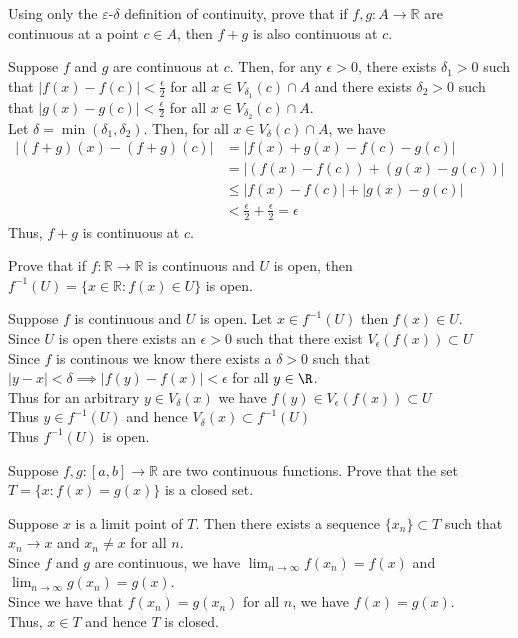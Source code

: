 \documentclass[answers,12pt,addpoints]{exam}
\begin{document}
\begin{questions}
    \question Using only the $\varepsilon$-$\delta$ definition of continuity, prove that if $f, g : A \to \mathbb{R}$ are continuous at a point $c \in A$, then $f + g$ is also continuous at $c$.
    \begin{solution}
        Suppose $f$ and $g$ are continuous at $c$. Then, for any $\epsilon > 0$, there exists $\delta_1 > 0$ such that $|f(x) - f(c)| < \frac{\epsilon}{2}$ for all $x \in V_{\delta_1}(c) \cap A$ and there exists $\delta_2 > 0$ such that $|g(x) - g(c)| < \frac{\epsilon}{2}$ for all $x \in V_{\delta_2}(c) \cap A$.\\
        Let $\delta = \min(\delta_1, \delta_2)$. Then, for all $x \in V_\delta(c) \cap A$, we have
        \begin{align*}
            |(f + g)(x) - (f + g)(c)| &= |f(x) + g(x) - f(c) - g(c)| \\
            &= |(f(x) - f(c)) + (g(x) - g(c))| \\
            &\leq |f(x) - f(c)| + |g(x) - g(c)| \\
            &< \frac{\epsilon}{2} + \frac{\epsilon}{2} = \epsilon
        \end{align*}
        Thus, $f + g$ is continuous at $c$.
    \end{solution}

    \question Prove that if $f : \mathbb{R} \to \mathbb{R}$ is continuous and $U$ is open, then $f^{-1}(U) = \{x \in \mathbb{R} : f(x) \in U\}$ is open.
    \begin{solution}
        Suppose $f$ is continuous and $U$ is open. Let $ x \in f^{-1}(U)$ then $f(x) \in U$. \\
        Since $U$ is open there exists an $\epsilon>0$ such that there exist $V_{\epsilon}(f(x)) \subset U$ \\
        Since $f$ is continous we know there exists a $\delta > 0$ such that $|y -x| < \delta \implies |f(y) - f(x)| < \epsilon$ for all $y \in \R$.\\
        Thus for an arbitrary $y \in V_{\delta}(x)$ we have $f(y) \in V_{\epsilon}(f(x)) \subset U$\\
        Thus $y \in f^{-1}(U)$ and hence $V_{\delta}(x) \subset f^{-1}(U)$\\
        Thus $f^{-1}(U)$ is open.
    \end{solution}

    \question Suppose $f, g : [a, b] \to \mathbb{R}$ are two continuous functions. Prove that the set $T = \{x : f(x) = g(x)\}$ is a closed set.
    \begin{solution}
        Suppose $x$ is a limit point of $T$. Then there exists a sequence $\{x_n\} \subset T$ such that $x_n \to x$ and $x_n \neq x$ for all $n$.\\
        Since $f$ and $g$ are continuous, we have $\lim_{n \to \infty} f(x_n) = f(x)$ and $\lim_{n \to \infty} g(x_n) = g(x)$.\\
        Since we have that $f(x_n) = g(x_n)$ for all $n$, we have $f(x) = g(x)$.\\
        Thus, $x \in T$ and hence $T$ is closed.
    \end{solution}


\end{questions}
\end{document}
